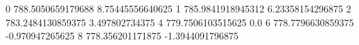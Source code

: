 0 788.5050659179688 8.75445556640625
1 785.9841918945312 6.23358154296875
2 783.2484130859375 3.497802734375
4 779.7506103515625 0.0
6 778.7796630859375 -0.970947265625
8 778.356201171875 -1.3944091796875
